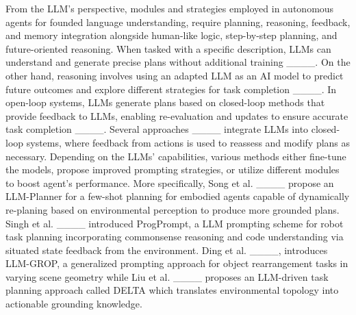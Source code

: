 From the LLM's perspective, modules and strategies employed in autonomous agents for founded language understanding, require planning, reasoning, feedback, and memory integration alongside human-like logic, step-by-step planning, and future-oriented reasoning. When tasked with a specific description, LLMs can understand and generate precise plans without additional training ____.
On the other hand, reasoning involves using an adapted LLM as an AI model to predict future outcomes and explore different strategies for task completion ____.  In open-loop systems, LLMs generate plans based on closed-loop methods that provide feedback to LLMs, enabling re-evaluation and updates to ensure accurate task completion ____. Several approaches ____ integrate LLMs into closed-loop systems, where feedback from actions is used to reassess and modify plans as necessary. Depending on the LLMs' capabilities, various methods either fine-tune the models, propose improved prompting strategies, or utilize different modules to boost agent's performance. More specifically, Song et al. ____ propose an LLM-Planner for a few-shot planning for embodied agents capable of dynamically re-planing based on environmental perception to produce more grounded plans. Singh et al. ____ introduced ProgPrompt, a LLM prompting scheme for robot task planning incorporating commonsense reasoning and code understanding via situated state feedback from the environment. Ding et al. ____, introduces LLM-GROP, a generalized prompting approach for object rearrangement tasks in varying scene geometry while Liu et al. ____ proposes an LLM-driven task planning approach called DELTA which translates environmental topology into actionable grounding knowledge.



